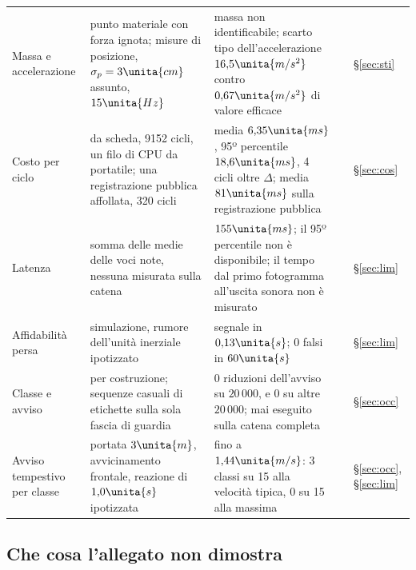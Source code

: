 \begin{table}[p]
\begin{tabularx}{\textwidth}{@{}>{\RaggedRight\arraybackslash}p{2.8cm}>{\RaggedRight\arraybackslash}p{4.1cm}L>{\RaggedRight\arraybackslash}p{1.2cm}>{\RaggedRight\arraybackslash}p{1.05cm}@{}}
Massa e accelerazione & punto materiale con forza ignota; misure di posizione, $\sigma_p=3\unita{cm}$ assunto, $15\unita{Hz}$ & massa non identificabile; scarto tipo dell'accelerazione $16{,}5\unita{m/s^2}$ contro $0{,}67\unita{m/s^2}$ di valore efficace &  & \S\ref{sec:sti}\\
Costo per ciclo & da scheda, 9152 cicli, un filo di CPU da portatile; una registrazione pubblica affollata, 320 cicli & media $6{,}35\unita{ms}$, 95º percentile $18{,}6\unita{ms}$, 4 cicli oltre $\Delta$; media $81\unita{ms}$ sulla registrazione pubblica &  & \S\ref{sec:cos}\\
Latenza & somma delle medie delle voci note, nessuna misurata sulla catena & $155\unita{ms}$; il 95º percentile non è disponibile; il tempo dal primo fotogramma all'uscita sonora non è misurato &  & \S\ref{sec:lim}\\
Affidabilità persa & simulazione, rumore dell'unità inerziale ipotizzato & segnale in $0{,}13\unita{s}$; 0 falsi in $60\unita{s}$ &  & \S\ref{sec:lim}\\
Classe e avviso & per costruzione; sequenze casuali di etichette sulla sola fascia di guardia & 0 riduzioni dell'avviso su $20\,000$, e 0 su altre $20\,000$; mai eseguito sulla catena completa &  & \S\ref{sec:occ}\\
Avviso tempestivo per classe & portata $3\unita{m}$, avvicinamento frontale, reazione di $1{,}0\unita{s}$ ipotizzata & fino a $1{,}44\unita{m/s}$: 3 classi su 15 alla velocità tipica, 0 su 15 alla massima &  & \S\ref{sec:occ}, \S\ref{sec:lim}\\
\bottomrule
\end{tabularx}
\end{table}

\subsection{Che cosa l'allegato non dimostra}\label{sec:intro-limiti}

